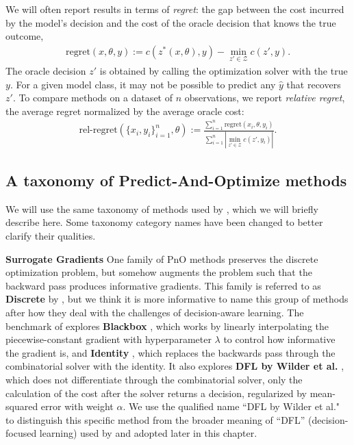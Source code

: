 We will often report results in terms of \emph{regret}: the gap between the cost incurred by the model's decision and the cost of the oracle decision that knows the true outcome,
\begin{align}
\text{regret}(x, \theta, y) := c(z^*(x, \theta), y) - \min_{z' \in \mathcal{Z}} c(z', y).
\end{align}
The oracle decision $z'$ is obtained by calling the optimization solver with the true $y$. For a given model class, it may not be possible to predict any $\hat{y}$ that recovers $z'$. To compare methods on a dataset of $n$ observations, we report \emph{relative regret}, the average regret normalized by the average oracle cost:
\begin{align}
\textstyle
\text{rel-regret}(\{x_i,y_i\}_{i=1}^n, \theta) := \frac{\sum_{i=1}^n \text{regret}(x_i, \theta, y_i)}{\sum_{i=1}^n |\min_{z' \in \mathcal{Z}} c(z', y_i)|}.
\end{align}

\subsection{A taxonomy of Predict-And-Optimize methods}
We will use the same taxonomy of methods used by \citeauthor{gengBenchmarkingPtOPnO2024}, which we will briefly describe here. Some taxonomy category names have been changed to better clarify their qualities.

\textbf{Surrogate Gradients}
One family of PnO methods preserves the discrete optimization problem, but somehow augments the problem such that the backward pass produces informative gradients. 
This family is referred to as \textbf{Discrete} by \citeauthor{gengBenchmarkingPtOPnO2024}, but we think it is more informative to name this group of methods after how they deal with the challenges of decision-aware learning.
The benchmark of \citet{gengBenchmarkingPtOPnO2024} explores \textbf{Blackbox} \citep{pogancicDifferentiationBlackboxCombinatorial2019}, which works by linearly interpolating the piecewise-constant gradient with hyperparameter $\lambda$ to control how informative the gradient is, and \textbf{Identity} \citep{sahooBackpropagationCombinatorialAlgorithms2022}, which replaces the backwards pass through the combinatorial solver with the identity. It also explores \textbf{DFL by Wilder et al.} \citep{wilderMeldingDatadecisionsPipeline2019}, which does not differentiate through the combinatorial solver, only the calculation of the cost after the solver returns a decision, regularized by mean-squared error with weight $\alpha$. We use the qualified name ``DFL by Wilder et al." to distinguish this specific method from the broader meaning of ``DFL'' (decision-focused learning) used by \citet{shahDecisionFocusedLearningDifferentiable2022} and adopted later in this chapter.

